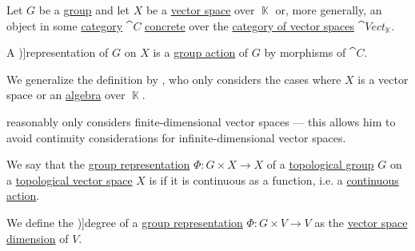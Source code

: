 \begin{definition}\label{def:group_representation}\mimprovised
  Let \( G \) be a \hyperref[def:group]{group} and let \( X \) be a \hyperref[def:vector_space]{vector space} over \( \BbbK \) or, more generally, an object in some \hyperref[def:category]{category} \( \cat{C} \) \hyperref[def:concrete_category]{concrete} over the \hyperref[def:vector_space]{category of vector spaces} \( \cat{Vect}_\BbbK \).

  A \term[ru=линейное представление (\cite[def. 11.1.1]{Винберг2014КурсАлгебры})]{representation} of \( G \) on \( X \) is a \hyperref[def:group_action]{group action} of \( G \) by morphisms of \( \cat{C} \).
\end{definition}
\begin{comments}
  \item We generalize the definition by , who only considers the cases where \( X \) is a vector space or an \hyperref[def:algebra_over_ring]{algebra} over \( \BbbK \).

   reasonably only considers finite-dimensional vector spaces --- this allows him to avoid continuity considerations for infinite-dimensional vector spaces.
\end{comments}

\begin{definition}\label{def:continuous_group_representation}
  We say that the \hyperref[def:group_representation]{group representation} \( \Phi: G \times X \to X \) of a \hyperref[def:topological_group]{topological group} \( G \) on a \hyperref[def:topological_vector_space]{topological vector space} \( X \) is  if it is continuous as a function, i.e. a \hyperref[def:continuous_monoid_action]{continuous action}.
\end{definition}

\begin{definition}\label{def:group_representation_degree}
  We define the \term[ru=размерность (представления) (\cite[def. 11.1.1]{Винберг2014КурсАлгебры})]{degree} of a \hyperref[def:group_representation]{group representation} \( \Phi: G \times V \to V \) as the \hyperref[def:vector_space_dimension]{vector space dimension} of \( V \).
\end{definition}

